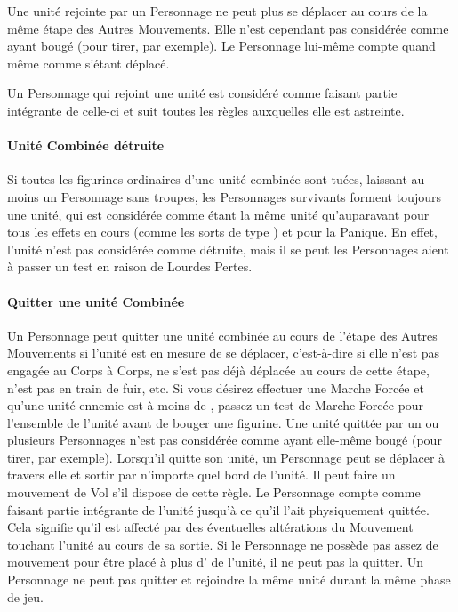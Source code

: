 Une unité rejointe par un Personnage ne peut plus se déplacer au cours de la même étape des Autres Mouvements. Elle n'est cependant pas considérée comme ayant bougé (pour tirer, par exemple). Le Personnage lui-même compte quand même comme s'étant déplacé.

Un Personnage qui rejoint une unité est considéré comme faisant partie intégrante de celle-ci et suit toutes les règles auxquelles elle est astreinte.

\paragraph{Unité Combinée détruite}

Si toutes les figurines ordinaires d'une unité combinée sont tuées, laissant au moins un Personnage sans troupes, les Personnages survivants forment toujours une unité, qui est considérée comme étant la même unité qu'auparavant pour tous les effets en cours (comme les sorts de type \lastsoneturn{}) et pour la Panique. En effet, l'unité n'est pas considérée comme détruite, mais il se peut les Personnages aient à passer un test en raison de Lourdes Pertes.

\paragraph{Quitter une unité Combinée}

Un Personnage peut quitter une unité combinée au cours de l'étape des Autres Mouvements si l'unité est en mesure de se déplacer, c'est-à-dire si elle n'est pas engagée au Corps à Corps, ne s'est pas déjà déplacée au cours de cette étape, n'est pas en train de fuir, etc. Si vous désirez effectuer une Marche Forcée et qu'une unité ennemie est à moins de , passez un test de Marche Forcée pour l'ensemble de l'unité avant de bouger une figurine. Une unité quittée par un ou plusieurs Personnages n'est pas considérée comme ayant elle-même bougé (pour tirer, par exemple). Lorsqu'il quitte son unité, un Personnage peut se déplacer à travers elle et sortir par n'importe quel bord de l'unité. Il peut faire un mouvement de Vol s'il dispose de cette règle. Le Personnage compte comme faisant partie intégrante de l'unité jusqu'à ce qu'il l'ait physiquement quittée. Cela signifie qu'il est affecté par des éventuelles altérations du Mouvement touchant l'unité au cours de sa sortie. Si le Personnage ne possède pas assez de mouvement pour être placé à plus d' de l'unité, il ne peut pas la quitter. Un Personnage ne peut pas quitter et rejoindre la même unité durant la même phase de jeu.

